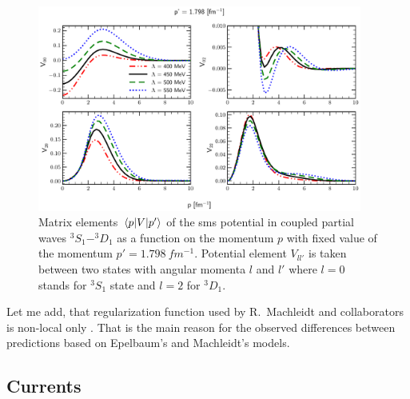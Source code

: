 \begin{figure}[htb]
    \begin{center}
    \includegraphics[width=0.95\textwidth]{PlotData/Deuteron/WAVEFUNC/potential_pp1.798.pdf}
    \end{center}
    \caption{Matrix elements $\matrixel{p}{V}{p^\prime}$ of the \gls{sms} potential in
    coupled partial waves $^3S_1 - ^3D_1$ as a function on the momentum $p$ with fixed
    value of the momentum $p'=\SI{1.798}{fm^{-1}}$. Potential element $V_{ll'}$
    is taken between two states with angular momenta  $l$ and $l'$ where $l=0$
    stands  for $^3S_1$ state and $l=2$ for $^3D_1$. 
    }
    \label{potential_cutoff}
\end{figure}


Let me add, that regularization function used by R.~Machleidt and collaborators 
is non-local only \cite{Entem2003, Entem2017}.
That is the main reason for the observed differences between predictions based on Epelbaum's
and Machleidt's models. 

\subsection*{Currents}


